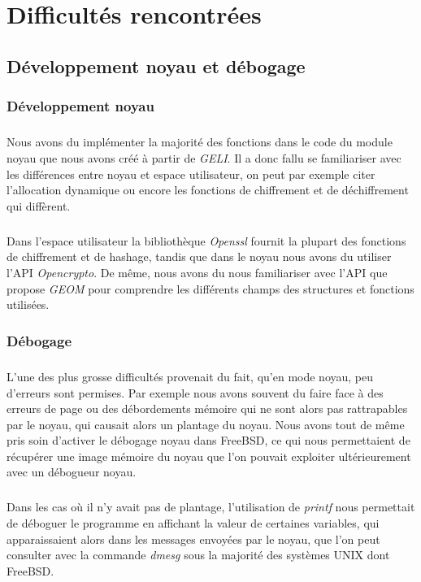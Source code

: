\chapter{Difficultés rencontrées}

\section{Développement noyau et débogage}

\subsection{Développement noyau}

\paragraph{}Nous avons du implémenter la majorité des fonctions dans le code du
module noyau que nous avons créé à partir de {\em GELI}. Il a donc fallu se
familiariser avec les différences entre noyau et espace utilisateur, on peut
par exemple citer l'allocation dynamique ou encore les fonctions de chiffrement
et de déchiffrement qui diffèrent.

\paragraph{}
Dans l'espace utilisateur la bibliothèque {\em Openssl} fournit la plupart des
fonctions de chiffrement et de hashage, tandis que dans le noyau nous avons du
utiliser l'API {\em Opencrypto}. De même, nous avons du nous familiariser avec
l'API que propose {\em GEOM} pour comprendre les différents champs des
structures et fonctions utilisées.

\subsection{Débogage}
\paragraph{}
L'une des plus grosse difficultés provenait du fait, qu'en mode noyau,
peu d'erreurs sont permises. Par exemple nous avons souvent du faire face à
des erreurs de page ou des débordements mémoire qui ne sont alors pas
rattrapables par le noyau, qui causait alors un plantage du noyau. Nous avons
tout de même pris soin d'activer le débogage noyau dans FreeBSD, ce qui nous
permettaient de récupérer une image mémoire du noyau que l'on pouvait exploiter
ultérieurement avec un débogueur noyau.

\paragraph{}Dans les cas où il n'y avait pas de plantage, l'utilisation de
{\em printf} nous permettait de déboguer le programme en affichant la valeur
de certaines variables, qui apparaissaient alors dans les messages envoyées par
le noyau, que l'on peut consulter avec la commande {\em dmesg} sous la majorité
des systèmes UNIX dont FreeBSD.




